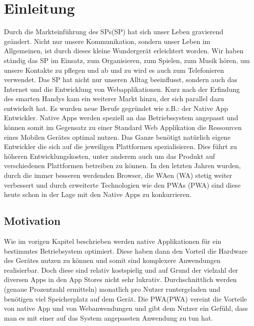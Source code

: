 \chapter{Einleitung}\label{chap:Einleitung}
\thispagestyle{standard}
\pagestyle{standard}
\renewcommand{\footrulewidth}{0.4pt}

Durch die Markteinführung des \acl{SP}s(\acs{SP}) hat sich unser Leben gravierend geändert. 
Nicht nur unsere Kommunikation, sondern unser Leben im Allgemeinen, ist durch dieses kleine Wundergerät erleichtert worden.
Wir haben ständig das \acs{SP} im Einsatz, zum Organisieren, zum Spielen, zum Musik hören, um unsere Kontakte zu pflegen und ab und zu wird es auch zum Telefonieren verwendet.
Das \acs{SP} hat nicht nur unseren Alltag beeinflusst, sondern auch das Internet und die Entwicklung von Webapplikationen. Kurz nach der Erfindung des smarten Handys kam ein weiterer Markt 
hinzu, der sich parallel dazu entwickelt hat. Es wurden neue Berufe gegründet wie z.B.: der Native App Entwickler.
Native Apps werden speziell an das Betriebssystem angepasst und können somit im Gegensatz zu einer Standard Web Applikation die Ressourcen eines Mobilen Gerätes optimal nutzen.
Das Ganze benötigt natürlich eigene Entwickler die sich auf die jeweiligen Plattformen spezialisieren.
Dies führt zu höheren Entwicklungskosten, unter anderem auch um das Produkt auf verschiedenen Plattformen betreiben zu können.
In den letzten Jahren wurden, durch die immer besseren werdenden Browser, die \acl{WA}en (\acs{WA}) stetig weiter verbessert und durch 
erweiterte Technologien wie den \acl{PWA}s (\acs{PWA}) sind diese heute schon in der Lage mit den Native Apps zu konkurrieren. 




\section{Motivation} \label{sub:Motivation}
Wie im vorigen Kapitel beschrieben werden native Applikationen für ein bestimmtes Betriebsystem optimiert. Diese haben dann den Vorteil die Hardware des Gerätes nutzen zu können und somit sind komplexere Anwendungen realisierbar. Doch diese sind relativ kostspielig und auf Grund der vielzahl der diversen Apps in den App Stores nicht sehr lukrativ.
Durchschnittlich werden (genaue Prozentzahl ermitteln) monatlich pro Nutzer runtergeladen und benötigen viel Speicherplatz auf dem Gerät.
Die \acl{PWA}(\acs{PWA}) vereint die Vorteile von native App und von Webanwendungen und gibt dem Nutzer ein Gefühl, dass man es mit einer auf das System angepassten Anwendung zu tun hat.




